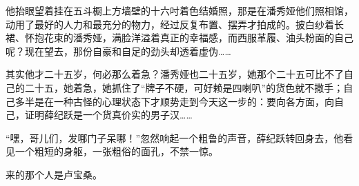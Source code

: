 \par 他抬眼望着挂在五斗橱上方墙壁的十六吋着色结婚照，那是在潘秀娅他们照相馆，动用了最好的人力和最充分的物力，经过反复布置、摆弄才拍成的。披白纱着长裙、怀抱花束的潘秀娅，满脸洋溢着真正的幸福感，而西服革履、油头粉面的自己呢？现在望去，那份自豪和自足的劲头却透着虚伪……
\par 其实他才二十五岁，何必那么着急？潘秀娅也二十五岁，她那个二十五可比不了自己的二十五，她着急，她抓住了“牌子不硬，可好赖是四喇叭”的货色就不撒手；自己多半是在一种古怪的心理状态下才顺势走到今天这一步的：要向各方面，向自己，证明薛纪跃是一个货真价实的男子汉……
\par “嘿，哥儿们，发哪门子呆哪！”忽然响起一个粗鲁的声音，薛纪跃转回身去，他看见一个粗短的身躯，一张粗俗的面孔，不禁一惊。
\par 来的那个人是卢宝桑。


